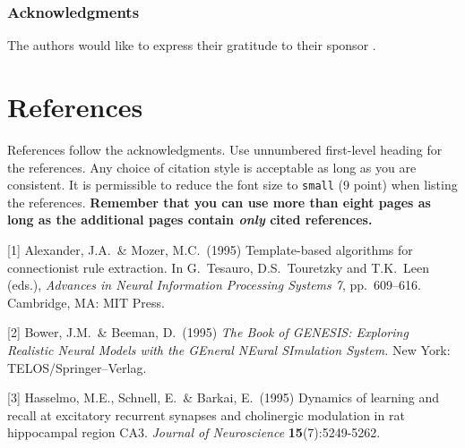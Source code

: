 \documentclass{article}
\begin{document}
%
%

\subsubsection*{Acknowledgments}

The authors would like to express their gratitude to their sponsor .

\section*{References}

References follow the acknowledgments. Use unnumbered first-level
heading for the references. Any choice of citation style is acceptable
as long as you are consistent. It is permissible to reduce the font
size to \verb+small+ (9 point) when listing the references. {\bf
  Remember that you can use more than eight pages as long as the
  additional pages contain \emph{only} cited references.}
\medskip

\small

[1] Alexander, J.A.\ \& Mozer, M.C.\ (1995) Template-based algorithms
for connectionist rule extraction. In G.\ Tesauro, D.S.\ Touretzky and
T.K.\ Leen (eds.), {\it Advances in Neural Information Processing
  Systems 7}, pp.\ 609--616. Cambridge, MA: MIT Press.

[2] Bower, J.M.\ \& Beeman, D.\ (1995) {\it The Book of GENESIS:
  Exploring Realistic Neural Models with the GEneral NEural SImulation
  System.}  New York: TELOS/Springer--Verlag.

[3] Hasselmo, M.E., Schnell, E.\ \& Barkai, E.\ (1995) Dynamics of
learning and recall at excitatory recurrent synapses and cholinergic
modulation in rat hippocampal region CA3. {\it Journal of
  Neuroscience} {\bf 15}(7):5249-5262.
\end{document}
